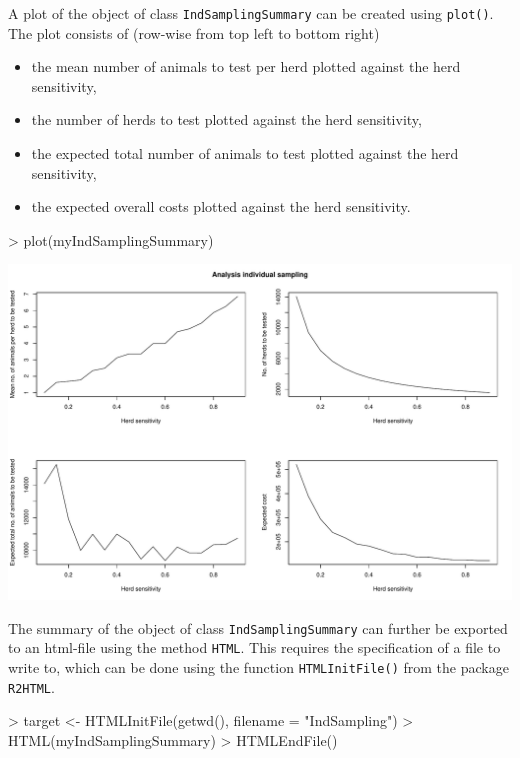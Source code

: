 \documentclass[nojss]{jss}
\begin{document}
 A plot of the object
of class \texttt{IndSamplingSummary} can be created using
\texttt{plot()}.  The
plot consists of (row-wise from top left to bottom right)

\begin{itemize}
\item the mean number of animals to test per herd plotted against the herd sensitivity,
\item the number of herds to test plotted against the herd sensitivity,
\item the expected total number of animals to test plotted against the herd sensitivity,
\item the expected overall costs plotted against the herd sensitivity.
\end{itemize}

\begin{Schunk}
\begin{Sinput}
> plot(myIndSamplingSummary)
\end{Sinput}
\end{Schunk}
\includegraphics{FFD-intro-004}

The summary of the object of class \texttt{IndSamplingSummary} can
further be exported to an html-file using the method \texttt{HTML}.
 This requires the
specification of a file to write to, which can be done using the
function \texttt{HTMLInitFile()} from the package \texttt{R2HTML}.

\begin{Schunk}
\begin{Sinput}
> target <- HTMLInitFile(getwd(), filename = "IndSampling")
> HTML(myIndSamplingSummary)
> HTMLEndFile()
\end{Sinput}
\end{Schunk} 
\end{document}
